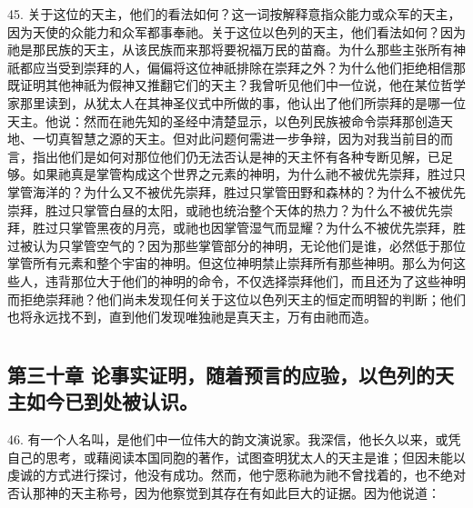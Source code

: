 45. 关于这位的天主，他们的看法如何？这一词按解释意指众能力或众军的天主，因为天使的众能力和众军都事奉祂。关于这位以色列的天主，他们看法如何？因为祂是那民族的天主，从该民族而来那将要祝福万民的苗裔。为什么那些主张所有神祇都应当受到崇拜的人，偏偏将这位神祇排除在崇拜之外？为什么他们拒绝相信那既证明其他神祇为假神又推翻它们的天主？我曾听见他们中一位说，他在某位哲学家那里读到，从犹太人在其神圣仪式中所做的事，他认出了他们所崇拜的是哪一位天主。他说：然而在祂先知的圣经中清楚显示，以色列民族被命令崇拜那创造天地、一切真智慧之源的天主。但对此问题何需进一步争辩，因为对我当前目的而言，指出他们是如何对那位他们仍无法否认是神的天主怀有各种专断见解，已足够。如果祂真是掌管构成这个世界之元素的神明，为什么祂不被优先崇拜，胜过只掌管海洋的？为什么又不被优先崇拜，胜过只掌管田野和森林的？为什么不被优先崇拜，胜过只掌管白昼的太阳，或祂也统治整个天体的热力？为什么不被优先崇拜，胜过只掌管黑夜的月亮，或祂也因掌管湿气而显耀？为什么不被优先崇拜，胜过被认为只掌管空气的？因为那些掌管部分的神明，无论他们是谁，必然低于那位掌管所有元素和整个宇宙的神明。但这位神明禁止崇拜所有那些神明。那么为何这些人，违背那位大于他们的神明的命令，不仅选择崇拜他们，而且还为了这些神明而拒绝崇拜祂？他们尚未发现任何关于这位以色列天主的恒定而明智的判断；他们也将永远找不到，直到他们发现唯独祂是真天主，万有由祂而造。\par



\section{}


\subsection{第三十章  论事实证明，随着预言的应验，以色列的天主如今已到处被认识。}

46. 有一个人名叫，是他们中一位伟大的韵文演说家。我深信，他长久以来，或凭自己的思考，或藉阅读本国同胞的著作，试图查明犹太人的天主是谁；但因未能以虔诚的方式进行探讨，他没有成功。然而，他宁愿称祂为祂不曾找着的，也不绝对否认那神的天主称号，因为他察觉到其存在有如此巨大的证据。因为他说道：\par

